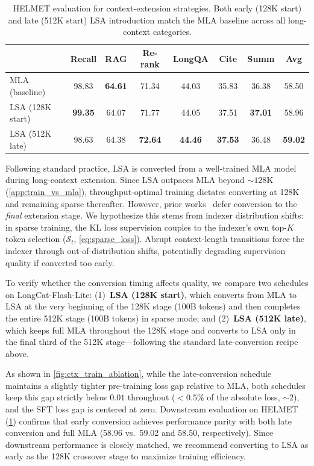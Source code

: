 \documentclass{article}
\newcommand{\longcat}{LongCat-Flash-Lite\xspace}
\newcommand{\kmax}{K}
\begin{document}
\begin{table}[htbp]
\centering
\small
\caption{HELMET evaluation for context-extension strategies. Both early (128K start) and late (512K start) LSA introduction match the MLA baseline across all long-context categories.}
\label{tab:ctx_chat_eval}
\begin{tabular}{l|cccccc|@{\hskip 10pt}c}
\toprule
 & Recall & RAG & Re-rank & LongQA & Cite & Summ & \textbf{Avg} \\
\midrule
MLA (baseline)         & 98.83 & \textbf{64.61} & 71.34 & 44.03 & 35.83 & 36.38 & 58.50 \\
LSA (128K start) & \textbf{99.35} & 64.07 & 71.77 & 44.05 & 37.51 & \textbf{37.01} & 58.96 \\
LSA (512K late)  & 98.63 & 64.38 & \textbf{72.64} & \textbf{44.46} & \textbf{37.53} & 36.48 & \textbf{59.02} \\
\bottomrule
\end{tabular}
\end{table}
Following standard practice, LSA is converted from a well-trained MLA model during long-context extension. Since LSA outpaces MLA beyond ${\sim}128$K (\cref{app:train_vs_mla}), throughput-optimal training dictates converting at 128K and remaining sparse thereafter. However, prior works~\citep{deepseek2025dsa,zeng2026glm5} defer conversion to the \emph{final} extension stage. We hypothesize this stems from indexer distribution shifts: in sparse training, the KL loss supervision couples to the indexer's own top-$\kmax$ token selection ($\mathcal{S}_t$, \cref{eq:sparse_loss}). Abrupt context-length transitions force the indexer through out-of-distribution shifts, potentially degrading supervision quality if converted too early.

To verify whether the conversion timing affects quality, we compare two schedules on \longcat: (1)~\textbf{LSA (128K start)}, which converts from MLA to LSA at the very beginning of the 128K stage (100B tokens) and then completes the entire 512K stage (100B tokens) in sparse mode; and (2)~\textbf{LSA (512K late)}, which keeps full MLA throughout the 128K stage and converts to LSA only in the final third of the 512K stage---following the standard late-conversion recipe above.

As shown in \cref{fig:ctx_train_ablation}, while the late-conversion schedule maintains a slightly tighter pre-training loss gap relative to MLA, both schedules keep this gap strictly below $0.01$ throughout ($<0.5\%$ of the absolute loss, ${\sim}2$), and the SFT loss gap is centered at zero. Downstream evaluation on HELMET (\cref{tab:ctx_chat_eval}) confirms that early conversion achieves performance parity with both late conversion and full MLA (58.96 vs.\ 59.02 and 58.50, respectively). Since downstream performance is closely matched, we recommend converting to LSA as early as the 128K crossover stage to maximize training efficiency.
\end{document}
